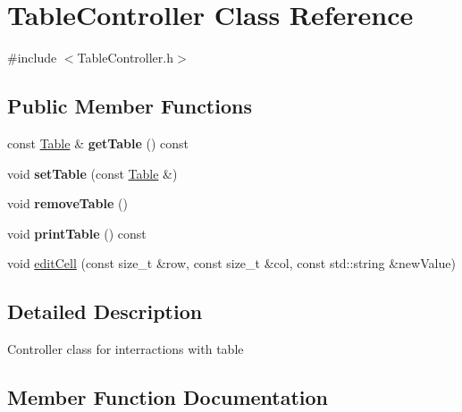 \hypertarget{classTableController}{}\section{Table\+Controller Class Reference}
\label{classTableController}


{\ttfamily \#include $<$Table\+Controller.\+h$>$}

\subsection*{Public Member Functions}
\begin{DoxyCompactItemize}
\item 
\mbox{\label{classTableController_a81466eb01b4eb4e6e0e01368ebf1e7ef}} 
const \hyperlink{classTable}{Table} \& {\bfseries get\+Table} () const
\item 
\mbox{\label{classTableController_af47d4fedb716fa31f73bcdfdc382c31b}} 
void {\bfseries set\+Table} (const \hyperlink{classTable}{Table} \&)
\item 
\mbox{\label{classTableController_a2714bec7998516a464b6b176ce203c74}} 
void {\bfseries remove\+Table} ()
\item 
\mbox{\label{classTableController_a829a829dc655cff7f281fec7aeb49570}} 
void {\bfseries print\+Table} () const
\item 
void \hyperlink{classTableController_a2ee6929343b83916c3972349e8c60089}{edit\+Cell} (const size\+\_\+t \&row, const size\+\_\+t \&col, const std\+::string \&new\+Value)
\end{DoxyCompactItemize}


\subsection{Detailed Description}
Controller class for interractions with table 

\subsection{Member Function Documentation}
\mbox{\label{classTableController_a2ee6929343b83916c3972349e8c60089}} 
